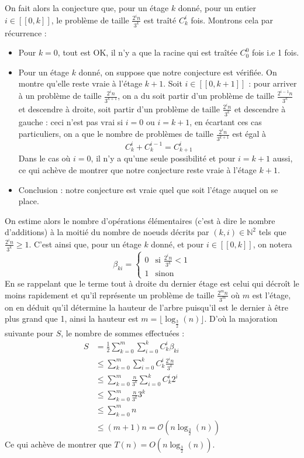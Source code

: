 \documentclass[17pt]{article}
\newcommand{\inl}[2]{[\![#1, #2]\!]}
\def\N{\mathbb N}
\begin{document}
	On fait alors la conjecture que, pour un étage $k$ donné, pour un entier $i\in\inl0k$, le problème de taille $\frac{2^in}{3^k}$ est traîté $C^i_k$ fois.
	\newpage
	Montrons cela par récurrence :
	\begin{itemize}
		\item Pour $k=0$, tout est OK, il n'y a que la racine qui est traîtée $C^0_0$ fois i.e 1 fois.
		\item Pour un étage $k$ donné, on suppose que notre conjecture est vérifiée. On montre qu'elle reste vraie à l'étage $k+1$. Soit $i\in\inl0{k+1}$ : pour arriver à un problème de taille $\frac{2^in}{3^{k+1}}$, on a du soit partir d'un problème de taille $\frac{2^{i-1}n}{3^k}$ et descendre à droite, soit partir d'un problème de taille $\frac{2^in}{3^k}$ et descendre à gauche : ceci n'est pas vrai si $i=0$ ou $i=k+1$, en écartant ces cas particuliers, on a que le nombre de problèmes de taille $\frac{2^in}{3^{k+1}}$ est égal à \[C^i_k+C^{i-1}_k=C^i_{k+1}\]
		Dans le cas où $i=0$, il n'y a qu'une seule possibilité et pour $i=k+1$ aussi, ce qui achève de montrer que notre conjecture reste vraie à l'étage $k+1$.
		\item Conclusion : notre conjecture est vraie quel que soit l'étage auquel on se place.
	\end{itemize}
	On estime alors le nombre d'opérations élémentaires (c'est à dire le nombre d'additions) à la moitié du nombre de noeuds décrits par $(k,i)\in\N^2$ tels que $\frac{2^in}{3^k}\geq 1$. C'est ainsi que, pour un étage $k$ donné, et pour $i\in\inl0k$, on notera \[\beta_{ki}=\begin{cases}0&\text{si }\frac{2^in}{3^k}<1\\1& \text{sinon}\end{cases}\]
	En se rappelant que le terme tout à droite du dernier étage est celui qui décroît le moins rapidement et qu'il représente un problème de taille $\frac{2^mn}{3^m}$ où $m$ est l'étage, on en déduit qu'il détermine la hauteur de l'arbre puisqu'il est le dernier à être plus grand que 1, ainsi la hauteur est $m=\lfloor\log_{\frac32}(n)\rfloor$. D'où la majoration suivante pour $S$, le nombre de sommes effectuées : 
	\begin{align*}
		S   &=\frac12 \sum_{k=0}^m\sum_{i=0}^kC^i_k\beta_{ki}\\
			&\leq \sum_{k=0}^m\sum_{i=0}^kC^i_k\frac{2^in}{3^k}\\
			&\leq \sum_{k=0}^m\frac n{3^k}\sum_{i=0}^kC^i_k2^i\\
			&\leq \sum_{k=0}^m\frac n{3^k}3^k\\
			&\leq \sum_{k=0}^mn\\
			&\leq (m+1)n=\mathcal O(n\log_{\frac32}(n))
	\end{align*}
	Ce qui achève de montrer que $T(n)=O(n\log_{\frac32}(n))$.
\end{document}
